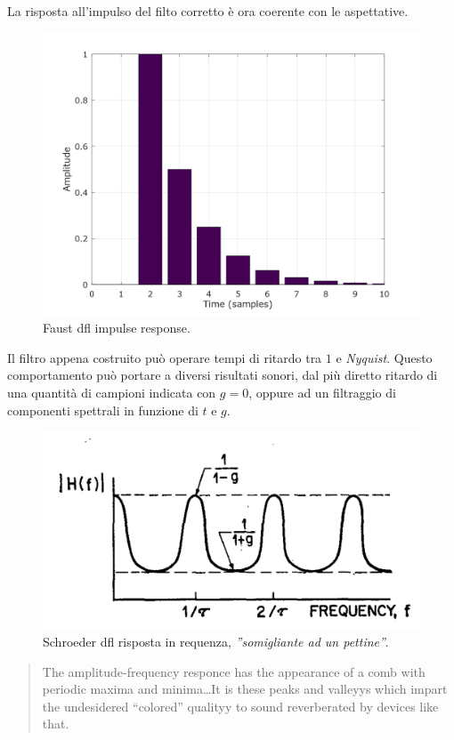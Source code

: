 \begin{refsection}


La risposta all'impulso del filto corretto è ora coerente con le aspettative.

\begin{figure}[ht]
  \centering
  \includegraphics[width=\textwidth]{CAPITOLI/0500/CODES/REV/dflc.png}
  \caption[]{Faust dfl impulse response.}
  \label{faust:dflir}
\end{figure}

Il filtro appena costruito può operare tempi di ritardo tra $1$ e \emph{Nyquist}.
Questo comportamento può portare a diversi risultati sonori, dal più diretto
ritardo di una quantità di campioni indicata con $g=0$, oppure ad un filtraggio di componenti
spettrali in funzione di $t$ e $g$.

\begin{figure}[h]
  \centering
  \includegraphics[width=\textwidth]{CAPITOLI/0500/IMG/dfl-fr.png}
  \caption[]{Schroeder dfl risposta in requenza, \emph{”somigliante ad un pettine”}.}
  \label{schroeder:dflffr}
\end{figure}

\begin{quote}
  The amplitude-frequency responce has the appearance of a comb with periodic
  maxima and minima\ldots It is these peaks and valleyys which impart the undesidered
  “colored” qualityy to sound reverberated by devices like that.
\end{quote}



\printbibliography
\end{refsection}
